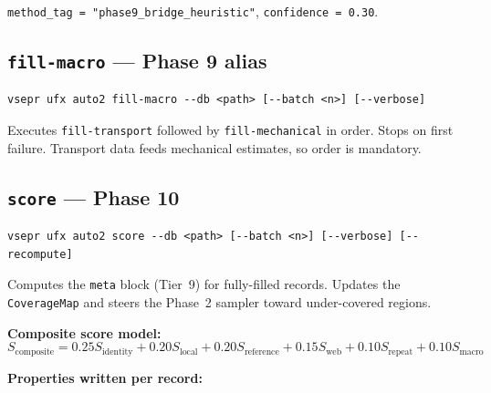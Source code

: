 \documentclass[11pt,letterpaper]{article}
\begin{document}
\texttt{method\_tag = "phase9\_bridge\_heuristic"}, \texttt{confidence = 0.30}.

\subsection{\texttt{fill-macro} --- Phase 9 alias}

\begin{lstlisting}
vsepr ufx auto2 fill-macro --db <path> [--batch <n>] [--verbose]
\end{lstlisting}

Executes \texttt{fill-transport} followed by \texttt{fill-mechanical} in
order.  Stops on first failure.  Transport data feeds mechanical
estimates, so order is mandatory.

\subsection{\texttt{score} --- Phase 10}

\begin{lstlisting}
vsepr ufx auto2 score --db <path> [--batch <n>] [--verbose] [--recompute]
\end{lstlisting}

Computes the \texttt{meta} block (Tier~9) for fully-filled records.
Updates the \texttt{CoverageMap} and steers the Phase~2 sampler
toward under-covered regions.

\textbf{Composite score model:}
\begin{equation}
  S_{\text{composite}} = 0.25 S_{\text{identity}} + 0.20 S_{\text{local}}
  + 0.20 S_{\text{reference}} + 0.15 S_{\text{web}}
  + 0.10 S_{\text{repeat}} + 0.10 S_{\text{macro}}
\end{equation}

\textbf{Properties written per record:}
\end{document}
